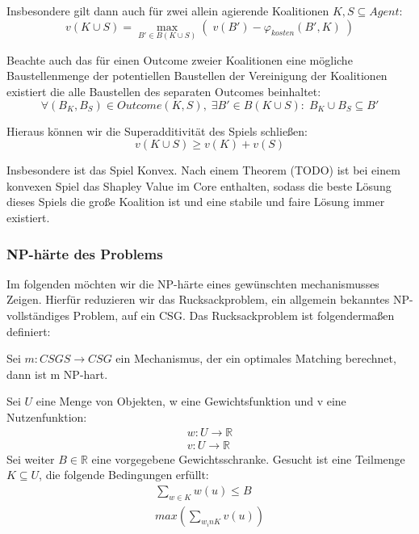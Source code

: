 \noindent
Insbesondere gilt dann auch für zwei allein agierende Koalitionen $K, S \subseteq Agent$:
\begin{equation}
  v(K\cup S) = \max_{B'\in B(K\cup S)} \left(\; v(B')-\varphi_{kosten}(B', K) \;\right)
\end{equation}

\noindent
Beachte auch das für einen Outcome zweier Koalitionen eine mögliche Baustellenmenge der potentiellen Baustellen der Vereinigung der Koalitionen existiert die alle Baustellen des separaten Outcomes beinhaltet:
\begin{equation}
  \forall (B_K, B_S)\in Outcome(K,S),\; \exists B'\in B(K\cup S):\; B_K\cup B_S\subseteq B'
\end{equation}

\noindent
Hieraus können wir die Superadditivität des Spiels schließen:
\begin{equation}
  v(K\cup S) \geq v(K) + v(S)
\end{equation}

\noindent
Insbesondere ist das Spiel Konvex.
Nach einem Theorem (TODO) ist bei einem konvexen Spiel das Shapley Value im Core enthalten, sodass die beste Lösung dieses Spiels die große Koalition ist und eine stabile und faire Lösung immer existiert.

\subsubsection{NP-härte des Problems}
Im folgenden möchten wir die NP-härte eines gewünschten mechanismusses Zeigen. Hierfür reduzieren wir das Rucksackproblem, ein allgemein bekanntes NP-vollständiges Problem, auf ein CSG.
Das Rucksackproblem ist folgendermaßen definiert:

\begin{lemma}
Sei $m:CSGS\rightarrow CSG$ ein Mechanismus, der ein optimales Matching berechnet, dann ist m NP-hart.
\end{lemma}

\begin{definition}[Rucksackproblem]
Sei $U$ eine Menge von Objekten, w eine Gewichtsfunktion und v eine Nutzenfunktion:
\begin{align}
  w: U\rightarrow \mathbb{R} \\
  v: U\rightarrow \mathbb{R}
\end{align}
Sei weiter $B\in\mathbb{R}$ eine vorgegebene Gewichtsschranke.
Gesucht ist eine Teilmenge $K\subseteq U$, die folgende Bedingungen erfüllt:
\begin{align}
  \sum_{w\in K}w(u)\leq B \label{bed1}\\
  max(\sum_{w_in K}v(u)) \label{bed2}
\end{align}
\end{definition}

